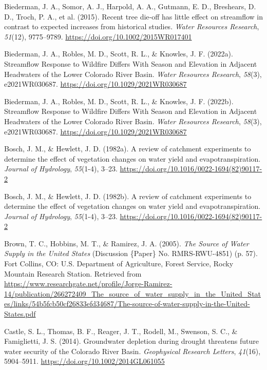 \documentclass[
]{agujournal2019}
\newlength{\cslhangindent}
\newenvironment{CSLReferences}[2] %
 {\begin{list}{}{%
  \setlength{\itemindent}{0pt}
  \setlength{\leftmargin}{0pt}
  \setlength{\parsep}{0pt}
  \ifodd #1
   \setlength{\leftmargin}{\cslhangindent}
   \setlength{\itemindent}{-1\cslhangindent}
  \fi
  \setlength{\itemsep}{#2\baselineskip}}}
 {\end{list}}
\begin{document}
\begin{CSLReferences}{1}{0}
Biederman, J. A., Somor, A. J., Harpold, A. A., Gutmann, E. D.,
Breshears, D. D., Troch, P. A., et al. (2015). Recent tree die‐off has
little effect on streamflow in contrast to expected increases from
historical studies. \emph{Water Resources Research}, \emph{51}(12),
9775--9789. \url{https://doi.org/10.1002/2015WR017401}

Biederman, J. A., Robles, M. D., Scott, R. L., \& Knowles, J. F.
(2022a). Streamflow {Response} to {Wildfire} {Differs} {With} {Season}
and {Elevation} in {Adjacent} {Headwaters} of the {Lower} {Colorado}
{River} {Basin}. \emph{Water Resources Research}, \emph{58}(3),
e2021WR030687. \url{https://doi.org/10.1029/2021WR030687}

Biederman, J. A., Robles, M. D., Scott, R. L., \& Knowles, J. F.
(2022b). Streamflow Response to Wildfire Differs With Season and
Elevation in Adjacent Headwaters of the Lower Colorado River Basin.
\emph{Water Resources Research}, \emph{58}(3), e2021WR030687.
\url{https://doi.org/10.1029/2021WR030687}

Bosch, J. M., \& Hewlett, J. D. (1982a). A review of catchment
experiments to determine the effect of vegetation changes on water yield
and evapotranspiration. \emph{Journal of Hydrology}, \emph{55}(1-4),
3--23. \url{https://doi.org/10.1016/0022-1694(82)90117-2}

Bosch, J. M., \& Hewlett, J. D. (1982b). A review of catchment
experiments to determine the effect of vegetation changes on water yield
and evapotranspiration. \emph{Journal of Hydrology}, \emph{55}(1-4),
3--23. \url{https://doi.org/10.1016/0022-1694(82)90117-2}

Brown, T. C., Hobbins, M. T., \& Ramirez, J. A. (2005). \emph{The
{Source} of {Water} {Supply} in the {United} {States}} (Discussion
\{Paper\} No. RMRS-RWU-4851) (p. 57). Fort Collins, CO: U.S. Department
of Agriculture, Forest Service, Rocky Mountain Research Station.
Retrieved from
\url{https://www.researchgate.net/profile/Jorge-Ramirez-14/publication/266272409_The_source_of_water_supply_in_the_United_States/links/54b5fcb50cf26833efd34687/The-source-of-water-supply-in-the-United-States.pdf}

Castle, S. L., Thomas, B. F., Reager, J. T., Rodell, M., Swenson, S. C.,
\& Famiglietti, J. S. (2014). Groundwater depletion during drought
threatens future water security of the Colorado River Basin.
\emph{Geophysical Research Letters}, \emph{41}(16), 5904--5911.
\url{https://doi.org/10.1002/2014GL061055}


\end{CSLReferences}
\end{document}
